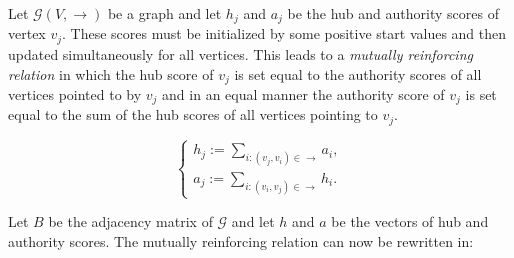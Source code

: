 \documentclass[a4paper,11pt]{report}
\newcommand{\graf}{\mathscr{G}}
\begin{document}
Let $\graf(V,\to)$ be a graph and let $h_j$ and $a_j$ be the hub and authority 
scores of vertex $v_j$. These scores must be initialized by some positive start values 
and then updated simultaneously for all vertices. This leads to a \emph{mutually reinforcing relation} 
in which the hub score of $v_j$ is set equal to the authority scores of all 
vertices pointed to by $v_j$ and in an equal manner the authority score of $v_j$ 
is set equal to the sum of the hub scores of all vertices pointing to $v_j$.

$$\begin{cases} h_j := \sum_{i:(v_j,v_i)\in \to} a_i,\\ 
a_j := \sum_{i:(v_i,v_j)\in \to} h_i.
\end{cases}$$ 

Let $B$ be the adjacency matrix of $\graf$ and let $h$ and $a$ be the vectors of 
hub and authority scores. The mutually reinforcing relation can now be rewritten 
in:
\end{document}

